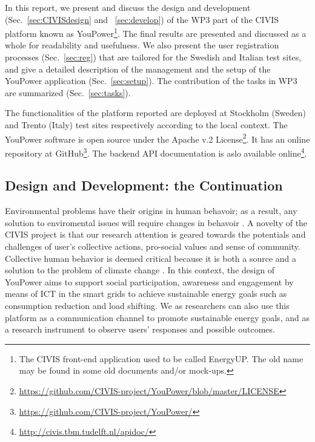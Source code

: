 In this report, we present and discuss the design and development (Sec.~\ref{sec:CIVISdesign} and ~\ref{sec:develop}) of the WP3 part of the CIVIS platform known as YouPower\footnote{The CIVIS front-end application used to be called EnergyUP. The old name may be found in some old documents and/or mock-ups.}. 
The final results are presented and discussed as a whole for readability and usefulness. 
% 
We also present the user registration processes (Sec.~\ref{sec:reg}) that are tailored for the Swedish and Italian test sites, and give a detailed description of the management and the setup of the YouPower application (Sec.~\ref{sec:setup}). The contribution of the tasks in WP3 are summarized (Sec.~\ref{sec:tasks}).

The functionalities of the platform reported are deployed at Stockholm (Sweden) and Trento (Italy) test sites respectively according to the local context. The YouPower software is open source under the Apache v.2 License\footnote{\url{https://github.com/CIVIS-project/YouPower/blob/master/LICENSE}}. It has  an online repository at GitHub\footnote{ \url{https://github.com/CIVIS-project/YouPower/}}. 
The backend API documentation is aslo available online\footnote{ \url{http://civis.tbm.tudelft.nl/apidoc/}}. 


\subsection{Design and Development: the Continuation}

Environmental problems have their origins in human behavoir; as a result, any solution to enviromental issues will require changes in behavoir 
\citep{Schultz2014}.
A novelty of the CIVIS project is that our research attention is geared towards the potentials and challenges of user's collective actions, pro-social values and sense of community. 
Collective human behavior is deemed critical because it is both a source and a solution to the problem of climate change \citep{Masson2014}.
In this context, the design of YouPower aims to support social participation, awareness and engagement by means of ICT in the smart grids to achieve sustainable energy goals such as consumption reduction and load shifting. We as researchers can also use this platform as a communication channel to promote sustainable energy goals, and as a research instrument to observe users' responses and possible outcomes. 

